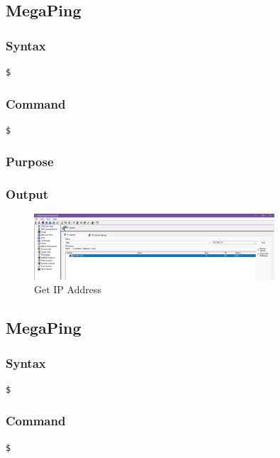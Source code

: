 \documentclass[11pt]{article}
\begin{document}
\subsection{MegaPing}

\subsubsection*{Syntax}
\begin{verbatim}
$
\end{verbatim}

\subsubsection*{Command}
\begin{verbatim}
$
\end{verbatim}

\subsubsection*{Purpose}

\subsubsection*{Output}
\begin{figure}[H]
    \centering
    \includegraphics[width=0.8\textwidth]{megaping (2).png}
    \caption{Get IP Address}
    \label{fig:1}
\end{figure}
\subsection{MegaPing}

\subsubsection*{Syntax}
\begin{verbatim}
$
\end{verbatim}

\subsubsection*{Command}
\begin{verbatim}
$
\end{verbatim}
\end{document}
